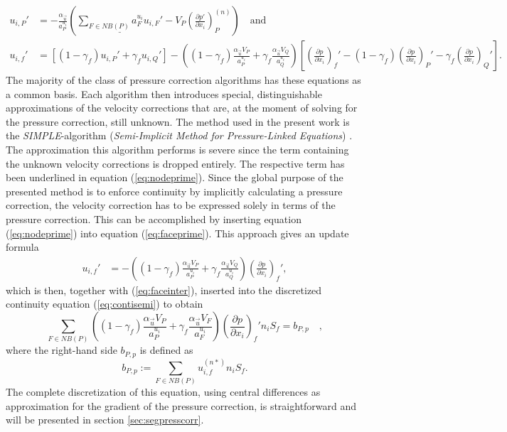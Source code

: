 \begin{align}
  \label{eq:nodeprime}
  u_{i,P}' 
  &=  
  - \frac{\alpha_{\vec{u}}}{a_P^{u_i}} \left(\underline{\sum_{F \in NB(P)} a_F^{u_i} u_{i,F}'}
  - V_P\left(\frac{\partial p'}{\partial x_i}\right)_P^{(n)} \right) \quad \text{and}\\[1em]
  \label{eq:faceprime}
  u_{i,f}' 
  &= 
  \left[\left(1 - \gamma_f\right) u_{i,P}' + \gamma_f u_{i,Q}' \right] 
  - 
  \left(\left(1 - \gamma_f\right) \frac{\alpha_\vec{u} V_P}{a_P^{u_i}} + \gamma_f \frac{\alpha_\vec{u} V_Q}{a_Q^{u_i}}\right)
  \left[ 
  \left(\frac{\partial p}{\partial x_i}\right)_f' 
  - \left( 1 - \gamma_f \right) \left( \frac{\partial p}{\partial x_i} \right)_P' 
  - \gamma_f \left(\frac{\partial p}{\partial x_i}\right)_Q' 
  \right].
\end{align}
The majority of the class of pressure correction algorithms has these equations as a common basis. Each algorithm then introduces special, distinguishable approximations of the velocity corrections that are, at the moment of solving for the pressure correction, still unknown. The method used in the present work is the \emph{SIMPLE}-algorithm (\emph{Semi-Implicit Method for Pressure-Linked Equations}) \cite{patankar72}. The approximation this algorithm performs is severe since the term containing the unknown velocity corrections is dropped entirely. The respective term has been underlined in equation (\ref{eq:nodeprime}). Since the global purpose of the presented method is to enforce continuity by implicitly calculating a pressure correction, the velocity correction has to be expressed solely in terms of the pressure correction. This can be accomplished by inserting equation (\ref{eq:nodeprime}) into equation (\ref{eq:faceprime}). This approach gives an update formula
\begin{align}
  \label{eq:velcorr}
  u_{i,f}' 
  &= 
  - \left(\left(1 - \gamma_f\right) \frac{\alpha_\vec{u} V_P}{a_P^{u_i}} + \gamma_f \frac{\alpha_\vec{u} V_Q}{a_Q^{u_i}}\right)
  \left(\frac{\partial p}{\partial x_i}\right)_f',
\end{align}
which is then, together with (\ref{eq:faceinter}), inserted into the discretized continuity equation (\ref{eq:contisemi}) to obtain
\begin{equation}
  \label{eq:presscorr}
  \sum_{F \in NB(P)} \left(\left(1 - \gamma_f\right) \frac{\alpha_\vec{u} V_P}{a_P^{u_i}} + \gamma_f \frac{\alpha_\vec{u} V_F}{a_F^{u_i}}\right)
  \left(\frac{\partial p}{\partial x_i}\right)_f' n_i S_f
  = b_{P,p}
  \quad,
\end{equation}
where the right-hand side \(b_{P,p}\) is defined as
\begin{equation}
  \label{eq:presscorrb}
  b_{P,p} := \sum_{F \in NB(P)} u_{i,f}^{(n*)} n_i S_f.
\end{equation}
The complete discretization of this equation, using central differences as approximation for the gradient of the pressure correction, is straightforward and will be presented in section \ref{sec:segpresscorr}.

